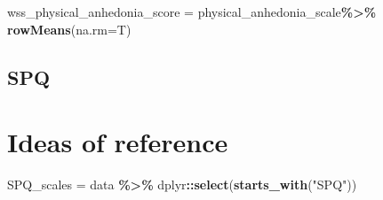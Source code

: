 \documentclass[
]{article}
\newenvironment{Shaded}{\begin{snugshade}}{\end{snugshade}}
\newcommand{\AttributeTok}[1]{\textcolor[rgb]{0.13,0.29,0.53}{#1}}
\newcommand{\FunctionTok}[1]{\textcolor[rgb]{0.13,0.29,0.53}{\textbf{#1}}}
\newcommand{\NormalTok}[1]{#1}
\newcommand{\OtherTok}[1]{\textcolor[rgb]{0.56,0.35,0.01}{#1}}
\newcommand{\SpecialCharTok}[1]{\textcolor[rgb]{0.81,0.36,0.00}{\textbf{#1}}}
\newcommand{\StringTok}[1]{\textcolor[rgb]{0.31,0.60,0.02}{#1}}
\begin{document}
\begin{Shaded}
\begin{Highlighting}[]
\NormalTok{wss\_physical\_anhedonia\_score }\OtherTok{=}\NormalTok{ physical\_anhedonia\_scale}\SpecialCharTok{\%\textgreater{}\%} \FunctionTok{rowMeans}\NormalTok{(}\AttributeTok{na.rm=}\NormalTok{T)}
\end{Highlighting}
\end{Shaded}

\begin{Shaded}
\end{Shaded}

\subsection{SPQ}\label{spq}

\section{Ideas of reference}\label{ideas-of-reference}

\begin{Shaded}
\begin{Highlighting}[]
\NormalTok{SPQ\_scales }\OtherTok{=}\NormalTok{ data }\SpecialCharTok{\%\textgreater{}\%}\NormalTok{ dplyr}\SpecialCharTok{::}\FunctionTok{select}\NormalTok{(}\FunctionTok{starts\_with}\NormalTok{(}\StringTok{"SPQ"}\NormalTok{))}
\end{Highlighting}
\end{Shaded}
\end{document}
